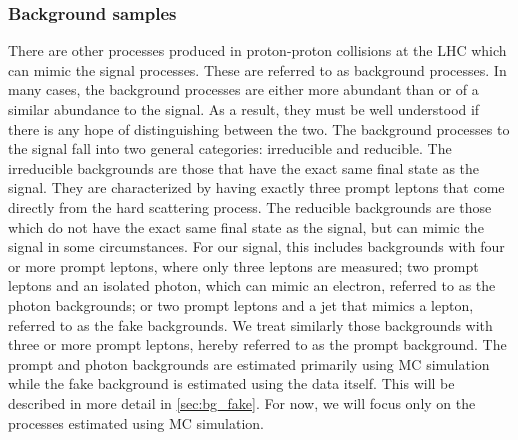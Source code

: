 \subsubsection{Background samples}
\label{sec:www_bg_samples}

There are other processes produced in proton-proton collisions at the LHC
which can mimic the signal processes. These are referred to as background processes.
In many cases, the background processes are either
more abundant than or of a similar abundance to
the signal. As a result, they must be well understood if there is any hope
of distinguishing between the two. The background processes to the signal
fall into two general categories: irreducible and reducible. 
The irreducible backgrounds are those that have the exact same final
state as the signal. They 
are characterized by having exactly three prompt leptons
that come directly from the hard scattering process.
The reducible backgrounds are those which do not have the exact same
final state as the signal, but can mimic the signal in some circumstances.
For our signal, this includes backgrounds with four or more prompt leptons,
where only three leptons are measured;
two prompt leptons and an isolated photon, which can mimic an electron,
referred to as the photon backgrounds;
or two prompt leptons and a jet that mimics a lepton, referred to as
the fake backgrounds.
We treat similarly those backgrounds with three or more prompt leptons,
hereby referred to as the prompt background.
The prompt and photon backgrounds 
are estimated primarily using MC simulation while the fake background
is estimated using the data itself. 
This will be described in more detail in \sec\ref{sec:bg_fake}.
For now, we will focus only on the processes estimated using MC simulation.

